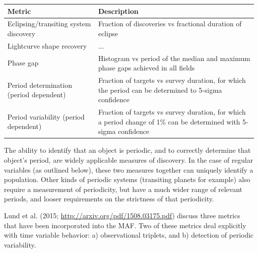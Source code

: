 \begin{center}
\begin{tabular}{| p{5cm} |p{10cm} |}
\hline Metric & Description\\
\hline
Eclipsing/transiting system discovery & Fraction of discoveries vs fractional duration of eclipse\\
Lightcurve shape recovery & ... \\
Phase gap & Histogram vs period of the median and maximum phase gaps achieved in all fields\\
Period determination (period dependent) & Fraction of targets vs survey duration, for which the period can be determined to 5-sigma confidence\\
Period variability (period dependent) & Fraction of targets vs survey duration, for which a period change of 1\% can be determined with 5-sigma confidence\\
  \hline \end{tabular}
 \end{center}

The ability to identify that an object is periodic, and to correctly determine that object's period, are widely applicable measures of discovery. In the case of regular variables (as outlined below), these two measures together can uniquely identify a population. Other kinds of periodic systems (transiting planets for example) also require a measurement of periodicity, but have a much wider range of relevant periods, and looser requirements on the strictness of that periodicity.

Lund et al. (2015; \url{http://arxiv.org/pdf/1508.03175.pdf}) discuss three metrics that have been incorporated into the MAF. Two of these metrics deal explicitly with time variable behavior: a) observational triplets, and b) detection of periodic variability.

